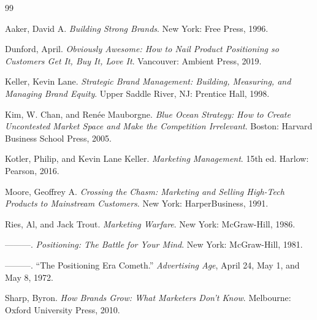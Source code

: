 \begin{thebibliography}{99}
\setlength{\itemsep}{0.55em}
\raggedright {} 

\bibitem{} Aaker, David A. \emph{Building Strong Brands}. New York: Free Press, 1996.

\bibitem{} Dunford, April. \emph{Obviously Awesome: How to Nail Product Positioning so Customers Get It, Buy It, Love It}. Vancouver: Ambient Press, 2019.

\bibitem{} Keller, Kevin Lane. \emph{Strategic Brand Management: Building, Measuring, and Managing Brand Equity}. Upper Saddle River, NJ: Prentice Hall, 1998.

\bibitem{} Kim, W. Chan, and Ren\'ee Mauborgne. \emph{Blue Ocean Strategy: How to Create Uncontested Market Space and Make the Competition Irrelevant}. Boston: Harvard Business School Press, 2005.

\bibitem{} Kotler, Philip, and Kevin Lane Keller. \emph{Marketing Management}. 15th ed. Harlow: Pearson, 2016.

\bibitem{} Moore, Geoffrey A. \emph{Crossing the Chasm: Marketing and Selling High-Tech Products to Mainstream Customers}. New York: HarperBusiness, 1991.

\bibitem{} Ries, Al, and Jack Trout. \emph{Marketing Warfare}. New York: McGraw-Hill, 1986.

\bibitem{} ---------. \emph{Positioning: The Battle for Your Mind}. New York: McGraw-Hill, 1981.

\bibitem{} ---------. ``The Positioning Era Cometh.'' \emph{Advertising Age}, April 24, May 1, and May 8, 1972.

\bibitem{} Sharp, Byron. \emph{How Brands Grow: What Marketers Don't Know}. Melbourne: Oxford University Press, 2010.

\end{thebibliography}
